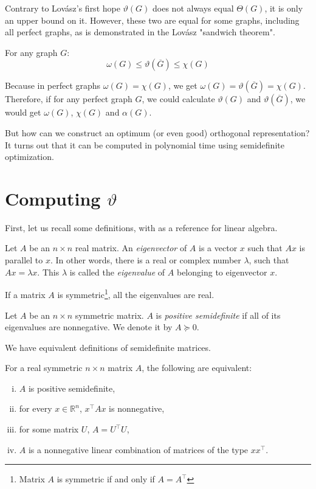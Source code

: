 Contrary to Lovász's first hope \cite{Lovasz1979} $\vartheta(G)$ does not always equal $\Theta(G)$, it is only an upper bound on it. However, these two are equal for some graphs, including all perfect graphs, as is demonstrated in the Lovász "sandwich theorem".

\begin{theorem}
  \label{thm:sandwich}
  For any graph $G$:
  $$ \omega(G) \leq \vartheta(\overline{G}) \leq \chi(G) $$
\end{theorem}

Because in perfect graphs $\omega(G) = \chi(G)$, we get $\omega(G) = \vartheta(\overline{G}) = \chi(G)$. Therefore, if for any perfect graph $G$, we could calculate $\vartheta(G)$ and $\vartheta(\overline{G})$, we would get $\omega(G)$, $\chi(G)$ and $\alpha(G)$.

But how can we construct an optimum (or even good) orthogonal representation? It turns out that it can be computed in polynomial time using semidefinite optimization.

\section{Computing \boldmath$\vartheta$}
\label{sec:computingTheta}

First, let us recall some definitions, with \cite{gilbertstrang2020} as a reference for linear algebra.

\begin{defn}
  Let $A$ be an $n \times n$ real matrix. An \emph{eigenvector} of $A$ is a vector $x$ such that $Ax$ is parallel to $x$. In other words, there is a real or complex number $\lambda$, such that $Ax = \lambda x$. This $\lambda$ is called the \emph{eigenvalue} of $A$ belonging to eigenvector $x$.
\end{defn}

If a matrix $A$ is symmetric\footnote{Matrix $A$ is symmetric if and only if $A = A^\intercal$}, all the eigenvalues are real.

\begin{defn}
  Let $A$ be an $n \times n$ symmetric matrix. $A$ is \emph{positive semidefinite} if all of its eigenvalues are nonnegative. We denote it by $A \succeq 0$.
\end{defn}

We have equivalent definitions of semidefinite matrices.
\begin{theorem}
  For a real symmetric $n \times n$ matrix $A$, the following are equivalent:
  \begin{enumerate}[(i)]
    \item $A$ is positive semidefinite,
    \item \label{en:ei2} for every $x \in \mathbb{R}^n$, $x^\intercal Ax$ is nonnegative,
    \item for some matrix $U$, $A = U^\intercal U$,
    \item $A$ is a nonnegative linear combination of matrices of the type $xx^\intercal$.
  \end{enumerate}
\end{theorem}


